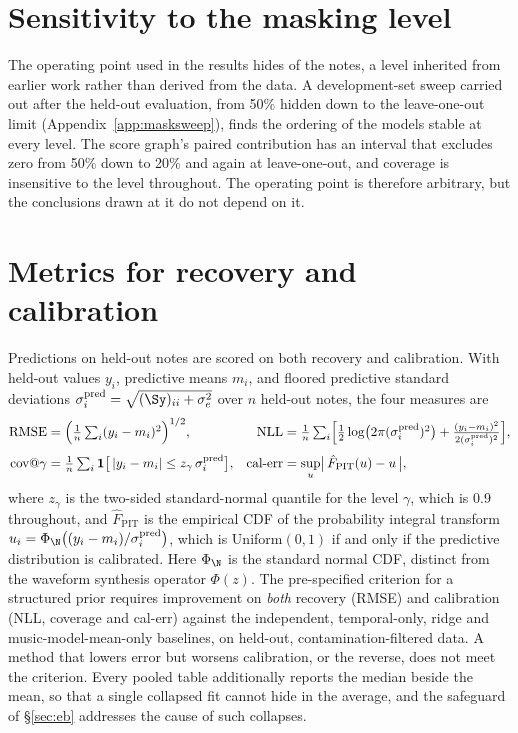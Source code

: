 \section{Sensitivity to the masking level}\label{sec:masksweep}
The operating point used in the results hides \maskRate{} of the notes, a
level inherited from earlier work rather than derived from the data. A
development-set sweep carried out after the held-out evaluation, from 50\%
hidden down to the leave-one-out limit (Appendix~\ref{app:masksweep}), finds
the ordering of the models stable at every level. The score graph's paired
contribution has an interval that excludes zero from 50\% down to 20\% and
again at leave-one-out, and coverage is insensitive to the level throughout.
The operating point is therefore arbitrary, but the conclusions drawn at it
do not depend on it.

\section{Metrics for recovery and calibration}\label{sec:metrics}
Predictions on held-out notes are scored on both recovery and calibration.
With held-out values $y_i$, predictive means $m_i$, and floored predictive
standard deviations $\sigma_i^{\mathrm{pred}} = \sqrt{(\Sy)_{ii} + \sigma_e^2}$
over $n$ held-out notes, the four measures are
\begin{align}
  \text{RMSE} &= \Bigl( \tfrac1n \textstyle\sum_i (y_i - m_i)^2 \Bigr)^{1/2},
  &
  \text{NLL} &= \tfrac1n \textstyle\sum_i \Bigl[ \tfrac12 \log\bigl(2\pi (\sigma_i^{\mathrm{pred}})^2\bigr)
        + \tfrac{(y_i - m_i)^2}{2 (\sigma_i^{\mathrm{pred}})^2} \Bigr],
  \\[3pt]
  \text{cov}@\gamma &= \tfrac1n \textstyle\sum_i \mathbf{1}\bigl[\, |y_i - m_i| \le z_{\gamma}\, \sigma_i^{\mathrm{pred}} \bigr],
  &
  \text{cal-err} &= \sup_u \bigl|\, \hat F_{\mathrm{PIT}}(u) - u \,\bigr|,
\end{align}
where $z_\gamma$ is the two-sided standard-normal quantile for the level
$\gamma$, which is 0.9 throughout, and $\hat F_{\mathrm{PIT}}$ is the
empirical CDF of the probability integral transform
$u_i = \Phi_{\N}\bigl((y_i - m_i)/\sigma_i^{\mathrm{pred}}\bigr)$, which is
Uniform$(0,1)$ if and only if the predictive distribution is calibrated. Here
$\Phi_{\N}$ is the standard normal CDF, distinct from the waveform synthesis
operator $\Phi(z)$. The pre-specified criterion for a structured prior
requires improvement on \emph{both} recovery (RMSE) and calibration (NLL,
coverage and cal-err) against the independent, temporal-only, ridge and
music-model-mean-only baselines, on held-out, contamination-filtered data. A
method that lowers error but worsens calibration, or the reverse, does not
meet the criterion. Every pooled table additionally reports the median beside
the mean, so that a single collapsed fit cannot hide in the average, and the
safeguard of \S\ref{sec:eb} addresses the cause of such collapses.

